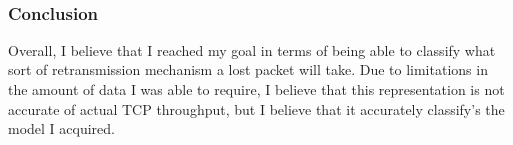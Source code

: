 \documentclass[11pt]{article}
\begin{document}
    \begin{center}
    \end{center}
    { \hspace*{\fill} \\}
    
    \hypertarget{conclusion}{%
\subsubsection{Conclusion}\label{conclusion}}

Overall, I believe that I reached my goal in terms of being able to
classify what sort of retransmission mechanism a lost packet will take.
Due to limitations in the amount of data I was able to require, I
believe that this representation is not accurate of actual TCP
throughput, but I believe that it accurately classify's the model I
acquired.


    
    
    
    
\end{document}
